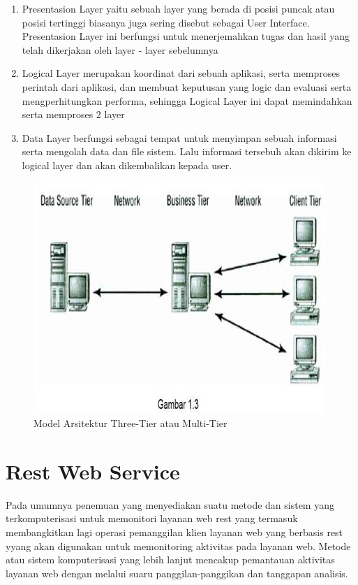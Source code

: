 	\begin{enumerate}
		\item Presentasion Layer yaitu sebuah layer yang berada di posisi puncak atau posisi tertinggi biasanya juga sering disebut
		         sebagai User Interface. Presentasion Layer ini berfungsi untuk menerjemahkan tugas dan hasil yang telah dikerjakan
		         oleh layer - layer sebelumnya
		\item Logical Layer merupakan koordinat dari sebuah aplikasi, serta memproses perintah dari aplikasi, dan membuat
		         keputusan yang logic dan evaluasi serta mengperhitungkan performa, sehingga Logical Layer ini dapat memindahkan
		         serta memproses 2 layer
		\item Data Layer berfungsi sebagai tempat untuk menyimpan sebuah informasi serta mengolah data dan file sistem. Lalu
		         informasi tersebuh akan dikirim ke logical layer dan akan dikembalikan kepada user.
	\end{enumerate}

\begin{figure}[h]
    \centerline{\includegraphics{figures/2model3tier.JPG}}
    \caption{Model Arsitektur Three-Tier atau Multi-Tier}
    \label{Tier3}
\end{figure}

\section{Rest Web Service}
Pada umumnya penemuan yang menyediakan suatu metode dan sistem yang terkomputerisasi untuk memonitori layanan web rest yang termasuk
membangkitkan lagi operasi pemanggilan klien layanan web yang berbasis rest yyang akan digunakan untuk memonitoring aktivitas pada layanan web.
Metode atau sistem komputerisasi yang lebih lanjut mencakup pemantauan aktivitas layanan web dengan melalui suaru panggilan-panggikan dan tanggapan analisis.

